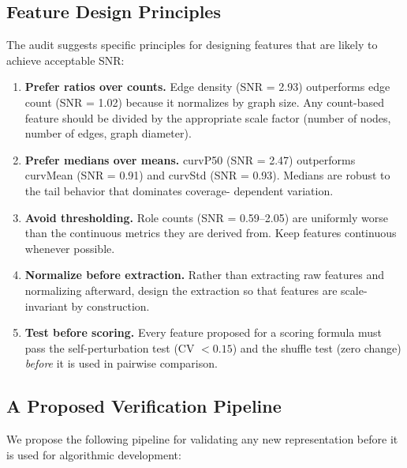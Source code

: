 \documentclass{../yalumba}
\begin{document}
\subsection{Feature Design Principles}

The audit suggests specific principles for designing features that are
likely to achieve acceptable SNR:

\begin{enumerate}
  \item \textbf{Prefer ratios over counts.}  Edge density (SNR = 2.93)
    outperforms edge count (SNR = 1.02) because it normalizes by graph
    size.  Any count-based feature should be divided by the appropriate
    scale factor (number of nodes, number of edges, graph diameter).
  \item \textbf{Prefer medians over means.}  curvP50 (SNR = 2.47)
    outperforms curvMean (SNR = 0.91) and curvStd (SNR = 0.93).
    Medians are robust to the tail behavior that dominates coverage-
    dependent variation.
  \item \textbf{Avoid thresholding.}  Role counts (SNR = 0.59--2.05)
    are uniformly worse than the continuous metrics they are derived
    from.  Keep features continuous whenever possible.
  \item \textbf{Normalize before extraction.}  Rather than extracting
    raw features and normalizing afterward, design the extraction so
    that features are scale-invariant by construction.
  \item \textbf{Test before scoring.}  Every feature proposed for a
    scoring formula must pass the self-perturbation test (CV $< 0.15$)
    and the shuffle test (zero change) \emph{before} it is used in
    pairwise comparison.
\end{enumerate}

\subsection{A Proposed Verification Pipeline}

We propose the following pipeline for validating any new representation
before it is used for algorithmic development:
\end{document}
